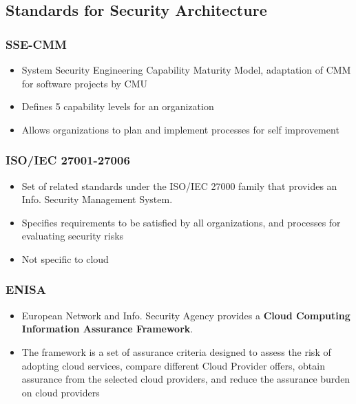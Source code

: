\documentclass{article}
\begin{document}
\subsection{Standards for Security Architecture}
\subsubsection{SSE-CMM}
\begin{itemize}
    \item System Security Engineering Capability Maturity Model, adaptation of CMM for software projects by CMU
    
    \item Defines 5 capability levels for an organization
    
    \item Allows organizations to plan and implement processes for self improvement
\end{itemize}

\subsubsection{ISO/IEC 27001-27006}
\begin{itemize}
    \item Set of related standards under the ISO/IEC 27000 family that provides an Info. Security Management System. 
    
    \item Specifies requirements to be satisfied by all organizations, and processes for evaluating security risks
    
    \item Not specific to cloud
\end{itemize}

\subsubsection{ENISA}
\begin{itemize}
    \item European Network and Info. Security Agency provides a \textbf{Cloud Computing Information Assurance Framework}. 
    
    \item The framework is a set of assurance criteria designed to assess the risk of adopting cloud services, compare different Cloud Provider offers, obtain assurance from the selected cloud providers, and reduce the assurance burden on cloud providers
\end{itemize}
\end{document}
